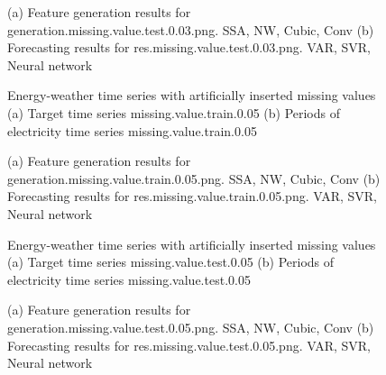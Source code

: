 \documentclass[12pt]{article}
\begin{document}
\begin{figure}
\centering
{}
\caption{(a)	Feature generation results for	generation.missing.value.test.0.03.png.	SSA, NW, Cubic, Conv	(b)	Forecasting results for	res.missing.value.test.0.03.png.	VAR, SVR, Neural network	}
\end{figure}


\begin{figure}
\centering
{}
\caption{Energy-weather time series with artificially inserted missing values	(a) Target time series	missing.value.train.0.05	(b) Periods of electricity time series	missing.value.train.0.05	}
\end{figure}


\begin{figure}
\centering
{}
\caption{(a)	Feature generation results for	generation.missing.value.train.0.05.png.	SSA, NW, Cubic, Conv	(b)	Forecasting results for	res.missing.value.train.0.05.png.	VAR, SVR, Neural network	}
\end{figure}


\begin{figure}
\centering
{}
\caption{Energy-weather time series with artificially inserted missing values	(a) Target time series	missing.value.test.0.05	(b) Periods of electricity time series	missing.value.test.0.05	}
\end{figure}


\begin{figure}
\centering
{}
\caption{(a)	Feature generation results for	generation.missing.value.test.0.05.png.	SSA, NW, Cubic, Conv	(b)	Forecasting results for	res.missing.value.test.0.05.png.	VAR, SVR, Neural network	}
\end{figure}
\end{document}
